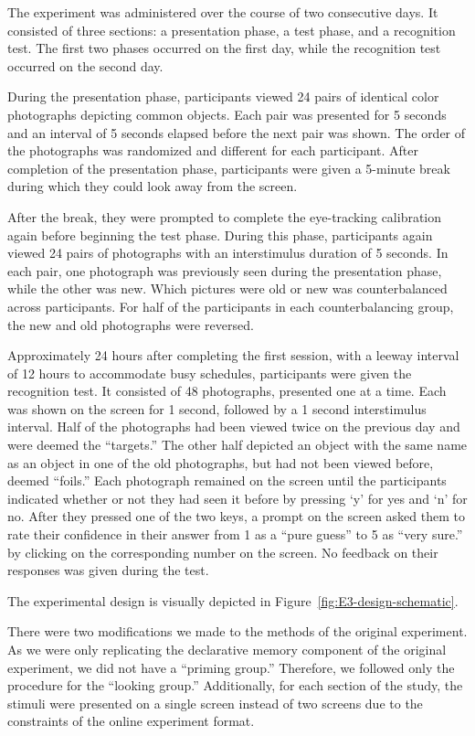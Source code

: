 \documentclass[
  man,floatsintext]{apa6}
\begin{document}
The experiment was administered over the course of two
consecutive days. It consisted of three sections: a presentation phase,
a test phase, and a recognition test. The first two phases occurred on
the first day, while the recognition test occurred on the second day.

During the presentation phase, participants viewed 24 pairs of identical
color photographs depicting common objects. Each pair was presented for
5 seconds and an interval of 5 seconds elapsed before the next pair was
shown. The order of the photographs was randomized and different for
each participant. After completion of the presentation phase,
participants were given a 5-minute break during which they could look
away from the screen.

After the break, they were prompted to complete the eye-tracking
calibration again before beginning the test phase. During this phase,
participants again viewed 24 pairs of photographs with an interstimulus
duration of 5 seconds. In each pair, one photograph was previously seen
during the presentation phase, while the other was new. Which pictures
were old or new was counterbalanced across participants.
For half of the participants in each counterbalancing group, the new and
old photographs were
reversed.

Approximately 24 hours after completing the first session, with a leeway
interval of 12 hours to accommodate busy schedules, participants were
given the recognition test. It consisted of 48 photographs, presented
one at a time. Each was shown on the screen for 1 second, followed by a
1 second interstimulus interval. Half of the photographs had been
viewed twice on the previous day and were deemed the ``targets.'' The
other half depicted an object with the same name as an object in one of
the old photographs, but had not been viewed before, deemed ``foils.''
Each photograph remained on the screen until the participants indicated
whether or not they had seen it before by pressing `y' for yes and `n'
for no. After they pressed one of the two keys, a prompt on the screen
asked them to rate their confidence in their answer from 1 as a ``pure
guess'' to 5 as ``very sure.'' by clicking on the corresponding number on
the screen. No feedback on their responses was given during the test.

The experimental design is visually depicted in Figure~\ref{fig:E3-design-schematic}.

There were two modifications we made to the methods of the original
experiment. As we were only replicating the declarative memory component
of the original experiment, we did not have a ``priming group.''
Therefore, we followed only the procedure for the ``looking group.''
Additionally, for each section of the study, the stimuli were presented
on a single screen instead of two screens due to the constraints of the
online experiment format.
\end{document}
